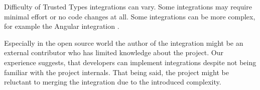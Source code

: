 Difficulty of Trusted Types integrations can vary. Some integrations may require minimal effort or
no code changes at all. Some integrations can be more complex, for example the Angular integration
\cite{tt_web_framework_paper}.

Especially in the open source world the author of the integration might be an external contributor
who has limited knowledge about the project. Our experience suggests, that developers can implement
integrations despite not being familiar with the project internals. That being said, the project
might be reluctant to merging the integration due to the introduced complexity.

